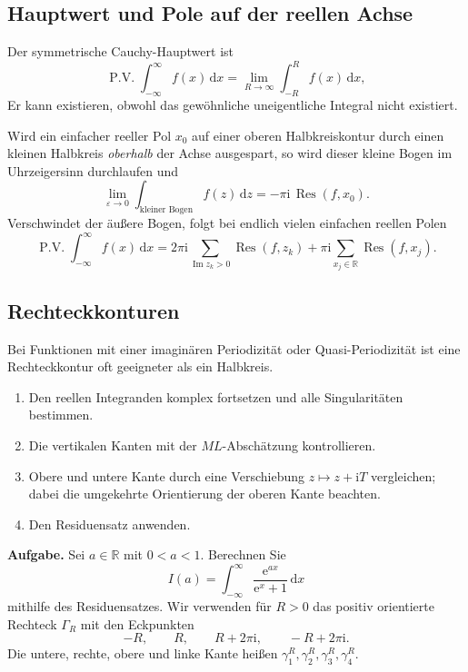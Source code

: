 \documentclass[11pt,a4paper]{article}
\newcommand{\R}{\mathbb R}
\newcommand{\ii}{\mathrm i}
\newcommand{\ee}{\mathrm e}
\newcommand{\dd}{\,\mathrm d}
\newcommand{\Res}{\operatorname{Res}}
\newcommand{\PV}{\operatorname{P.V.}}
\newcommand{\Imm}{\operatorname{Im}}
\newcommand{\1}{\mathbf 1}
\begin{document}
{\subsection{Hauptwert und Pole auf der reellen Achse}
Der symmetrische Cauchy-Hauptwert ist
\[
\PV\int_{-\infty}^{\infty}f(x)\dd x
=\lim_{R\to\infty}\int_{-R}^{R}f(x)\dd x,
\]
Er kann existieren, obwohl das gewöhnliche uneigentliche Integral nicht existiert.

Wird ein einfacher reeller Pol $x_0$ auf einer oberen Halbkreiskontur durch einen
kleinen Halbkreis \emph{oberhalb} der Achse ausgespart, so wird dieser kleine Bogen
im Uhrzeigersinn durchlaufen und
\[
\lim_{\varepsilon\to0}\int_{\text{kleiner Bogen}}f(z)\dd z
=-\pi\ii\,\Res(f,x_0).
\]
Verschwindet der äußere Bogen, folgt bei endlich vielen einfachen reellen Polen
\[
\PV\int_{-\infty}^{\infty}f(x)\dd x
=2\pi\ii\sum_{\Imm z_k>0}\Res(f,z_k)
+\pi\ii\sum_{x_j\in\R}\Res(f,x_j).
\]

\subsection{Rechteckkonturen}
Bei Funktionen mit einer imaginären Periodizität oder Quasi-Periodizität ist eine
Rechteckkontur oft geeigneter als ein Halbkreis.

\begin{kochrezeptbox}[title=Integral mit einer Rechteckkontur]
\begin{enumerate}
\item Den reellen Integranden komplex fortsetzen und alle Singularitäten
bestimmen.
\item Die vertikalen Kanten mit der $ML$-Abschätzung kontrollieren.
\item Obere und untere Kante durch eine Verschiebung
$z\mapsto z+\ii T$ vergleichen; dabei die umgekehrte Orientierung der oberen
Kante beachten.
\item Den Residuensatz anwenden.
\end{enumerate}
\end{kochrezeptbox}

\begin{beispielbox}[title={Vorgerechnetes Prüfungsbeispiel: Aufgabe 12 (2025) -- uneigentliches Integral mit Rechteckkontur}]
\textbf{Aufgabe.} Sei $a\in\R$ mit $0<a<1$. Berechnen Sie
\[
I(a)=\int_{-\infty}^{\infty}\frac{\ee^{ax}}{\ee^x+1}\dd x
\]
mithilfe des Residuensatzes. Wir verwenden für $R>0$ das positiv orientierte
Rechteck $\Gamma_R$ mit den Eckpunkten
\[
-R,\qquad R,\qquad R+2\pi\ii,\qquad -R+2\pi\ii.
\]
Die untere, rechte, obere und linke Kante heißen
$\gamma_1^R,\gamma_2^R,\gamma_3^R,\gamma_4^R$.


\end{beispielbox}}
\end{document}
